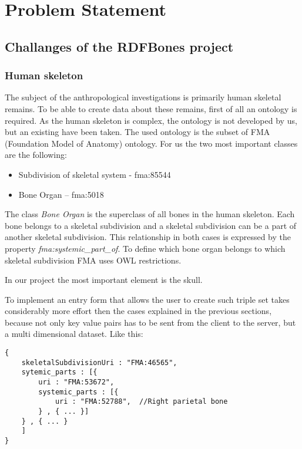 \chapter{Problem Statement}

\section{Challanges of the RDFBones project}

\subsection{Human skeleton}

The subject of the anthropological investigations is primarily human skeletal remains. To be able to create data about these remains, first of all an ontology is required. As the human skeleton is complex, the ontology is not developed by us, but an existing have been taken. The used ontology is the subset of FMA (Foundation Model of Anatomy) ontology. For us the two most important classes are the following: 

\begin{itemize}
	\item Subdivision of skeletal system - fma:85544  
	\item Bone Organ – fma:5018
\end{itemize}

The class \textit{Bone Organ} is the superclass of all bones in the human skeleton.  Each bone belongs to a skeletal subdivision and a skeletal subdivision can be a part of another skeletal subdivision. This relationship in both cases is expressed by the property \textit{fma:systemic\_part\_of}. To define which bone organ belongs to which skeletal subdivision FMA uses OWL restrictions.



In our project the most important element is the skull.  




To implement an entry form that allows the user to create such triple set takes considerably more effort then the cases explained in the previous sections, because not only key value pairs has 
to be sent from the client to the server, but a multi dimensional dataset. Like this: 


\begin{lstlisting}[captionpos=b, caption=Form data representing skull, label=skullJSON,
basicstyle=\footnotesize,frame=single]
{
	skeletalSubdivisionUri : "FMA:46565",
	sytemic_parts : [{
		uri : "FMA:53672",
		systemic_parts : [{
			uri : "FMA:52788",  //Right parietal bone
		} , { ... }]
	} , { ... }
	]	
}
\end{lstlisting}


